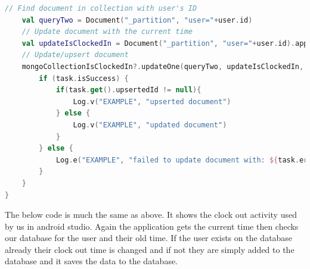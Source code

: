 \begin{lstlisting}[caption={Clock In code}, label={lst:example1}, language=Kotlin]
    // Find document in collection with user's ID
    val queryTwo = Document("_partition", "user="+user.id)
    // Update document with the current time
    val updateIsClockedIn = Document("_partition", "user="+user.id).append("clockedIn", true)
    // Update/upsert document
    mongoCollectionIsClockedIn?.updateOne(queryTwo, updateIsClockedIn, updateOptions)?.getAsync { task ->
        if (task.isSuccess) {
            if(task.get().upsertedId != null){
                Log.v("EXAMPLE", "upserted document")
            } else {
                Log.v("EXAMPLE", "updated document")
            }
        } else {
            Log.e("EXAMPLE", "failed to update document with: ${task.error}")
        }
    }
}
\end{lstlisting}


The below code is much the same as above. It shows the clock out activity used by us in android studio. Again the application gets the current time then checks our database for the user and their old time. If the user exists on the database already their clock out time is changed and if not they are simply added to the database and it saves the data to the database.
